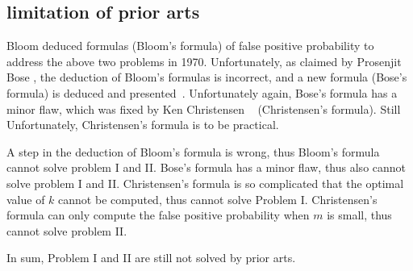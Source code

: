 
\subsection{limitation of prior arts}
Bloom \etal deduced formulas (Bloom's formula) of false positive probability to address the above two problems in 1970. Unfortunately, as claimed by Prosenjit Bose \etal, the deduction of Bloom's formulas is incorrect, and a new formula (Bose's formula) is deduced and presented~\cite{bose2008false}. 
Unfortunately again, Bose's formula has a minor flaw, which was fixed by Ken Christensen \etal~\cite{ken2010false} (Christensen's formula). Still Unfortunately, Christensen's formula is to be practical.


A step in the deduction of Bloom's formula is wrong, thus Bloom's formula cannot solve problem I and II.
Bose's formula has a minor flaw, thus also cannot solve problem I and II. 
Christensen's formula is so complicated that the optimal value of $k$ cannot be computed, thus cannot solve Problem I. 
Christensen's formula can only compute the false positive probability when $m$ is small, thus cannot solve problem II.

In sum, Problem I and II are still not solved by prior arts. 


%
%



%
